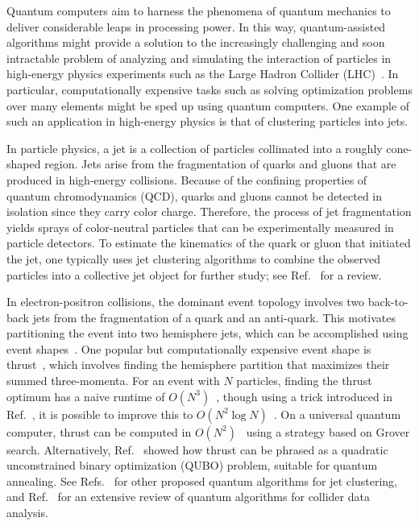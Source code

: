 \documentclass[aps,prd,twocolumn,superscriptaddress,preprintnumbers,nofootinbib,longbibliography,floatfix]{revtex4-1}
\DeclareRobustCommand{\Ref}[1]{Ref.~\cite{#1}}
\DeclareRobustCommand{\Refs}[1]{Refs.~\cite{#1}}
\begin{document}
Quantum computers aim to harness the phenomena of quantum mechanics to deliver considerable leaps in processing power.
%
In this way, quantum-assisted algorithms might provide a solution to the increasingly challenging and soon intractable problem of analyzing and simulating the interaction of particles in high-energy physics experiments such as the Large Hadron Collider (LHC)~\cite{Alves:2017she}.
%
In particular, computationally expensive tasks such as solving optimization problems over many elements might be sped up using quantum computers.
%
One example of such an application in high-energy physics is that of clustering particles into jets.


In particle physics, a jet is a collection of particles collimated into a roughly cone-shaped region.
%
Jets arise from the fragmentation of quarks and gluons that are produced in high-energy collisions.
%
Because of the confining properties of quantum chromodynamics (QCD), quarks and gluons cannot be detected in isolation since they carry color charge.
%
Therefore, the process of jet fragmentation yields sprays of color-neutral particles that can be experimentally measured in particle detectors.
%
To estimate the kinematics of the quark or gluon that initiated the jet, one typically uses jet clustering algorithms to combine the observed particles into a collective jet object for further study; see \Ref{Salam:2010nqg} for a review.


In electron-positron collisions, the dominant event topology involves two back-to-back jets from the fragmentation of a quark and an anti-quark.
%
This motivates partitioning the event into two hemisphere jets, which can be accomplished using event shapes~\cite{PhysRevLett.35.1609}.
%
One popular but computationally expensive event shape is thrust~\cite{BRANDT196457,PhysRevLett.39.1587}, which involves finding the hemisphere partition that maximizes their summed three-momenta.
%
For an event with $N$ particles, finding the thrust optimum has a naive runtime of $O(N^3)$~\cite{YAMAMOTO1983597}, though using a trick introduced in \Ref{Salam_2007}, it is possible to improve this to $O(N^2 \log N)$~\cite{PhysRevD.101.094015}.
%
On a universal quantum computer, thrust can be computed in $O(N^2)$~\cite{PhysRevD.101.094015} using a strategy based on Grover search.
%
Alternatively, \Ref{PhysRevD.101.094015} showed how thrust can be phrased as a quadratic unconstrained binary optimization (QUBO) problem, suitable for quantum annealing.
%
See \Refs{Pires:2020urc,Pires:2021fka,Kim:2021wrr,deLejarza:2022bwc} for other proposed quantum algorithms for jet clustering, and \Ref{Delgado:2022tpc} for an extensive review of quantum algorithms for collider data analysis.
\end{document}
